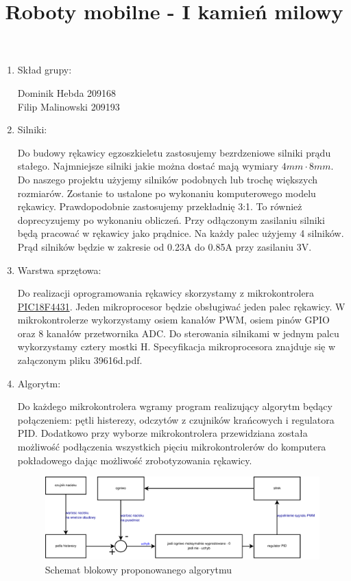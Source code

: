 \documentclass[a4paper]{article}
\author{}
\title{Roboty mobilne - I kamień milowy}
\date{}
\begin{document}
\maketitle

\begin{enumerate}

\item Skład grupy:

Dominik Hebda 209168 \\
Filip Malinowski 209193

\item Silniki:

Do budowy rękawicy egzoszkieletu zastosujemy bezrdzeniowe silniki prądu stałego. Najmniejsze silniki jakie można dostać mają wymiary
\begin{math}
4mm \cdot 8mm.
\end{math}
Do naszego projektu użyjemy silników podobnych lub trochę większych rozmiarów. Zostanie to ustalone po wykonaniu komputerowego modelu rękawicy. Prawdopodobnie zastosujemy przekładnię 3:1. To również doprecyzujemy po wykonaniu obliczeń. Przy odłączonym zasilaniu silniki będą pracować w rękawicy jako prądnice. Na każdy palec użyjemy 4 silników. Prąd silników będzie w zakresie od 0.23A do 0.85A przy zasilaniu 3V.

\item Warstwa sprzętowa:

Do realizacji oprogramowania rękawicy skorzystamy z mikrokontrolera
\href{http://www.microchip.com/wwwproducts/en/PIC18F4431}{PIC18F4431}.
Jeden mikroprocesor będzie obsługiwać jeden palec rękawicy. W mikrokontrolerze wykorzystamy osiem kanałów PWM, osiem pinów GPIO oraz 8 kanałów przetwornika ADC. Do sterowania silnikami w jednym palcu wykorzystamy cztery mostki H. Specyfikacja mikroprocesora znajduje się w załączonym pliku 39616d.pdf.


\item Algorytm:

Do każdego mikrokontrolera wgramy program realizujący algorytm będący połączeniem: pętli histerezy, odczytów z czujników krańcowych i regulatora PID. Dodatkowo przy wyborze mikrokontrolera przewidziana została możliwość podłączenia wszystkich pięciu mikrokontrolerów do komputera pokładowego dając możliwość zrobotyzowania rękawicy.

\begin{figure}[H]
\centering
\includegraphics[width=12cm]{schemat_blokowy_algorytmu.eps}
\caption{Schemat blokowy proponowanego algorytmu}
\end{figure}



\end{enumerate}
\end{document}
